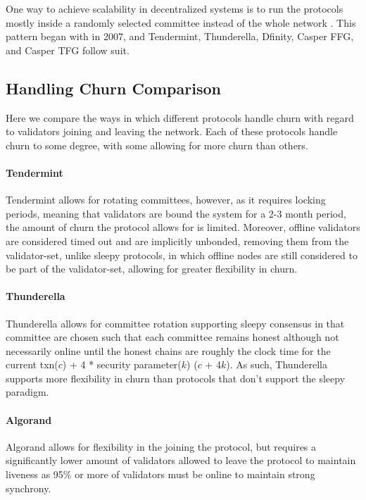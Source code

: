 \documentclass[10pt,journal,compsoc]{IEEEtran}
\begin{document}
One way to achieve scalability in decentralized systems is to run the protocols mostly inside a randomly selected committee instead of the whole network \cite{KapronEtAl}. This pattern began with \cite{KingEtAl} in 2007, and Tendermint, Thunderella, Dfinity, Casper FFG, and Casper TFG follow suit.

\subsection{Handling Churn Comparison}
Here we compare the ways in which different protocols handle churn with regard to validators joining and leaving the network. Each of these protocols handle churn to some degree, with some allowing for more churn than others. 

\paragraph{Tendermint} Tendermint allows for rotating committees, however, as it requires locking periods, meaning that validators are bound the system for a 2-3 month period, the amount of churn the protocol allows for is limited. Moreover, offline validators are considered timed out and are implicitly unbonded, removing them from the validator-set, unlike sleepy protocols, in which offline nodes are still considered to be part of the validator-set, allowing for greater flexibility in churn. \cite{Sleepy}

\paragraph{Thunderella} Thunderella allows for committee rotation supporting sleepy consensus in that committee are chosen such that each committee remains honest although not necessarily online until the honest chains are roughly the clock time for the current txn($c$) + 4 * security parameter($k$) ($c$ + 4$k$). As such, Thunderella supports more flexibility in churn than protocols that don't support the sleepy paradigm. 
	
\paragraph{Algorand} Algorand allows for flexibility in the joining the protocol, but requires a significantly lower amount of validators allowed to leave the protocol to maintain liveness as 95\% or more of validators must be online to maintain strong synchrony.
\end{document}
